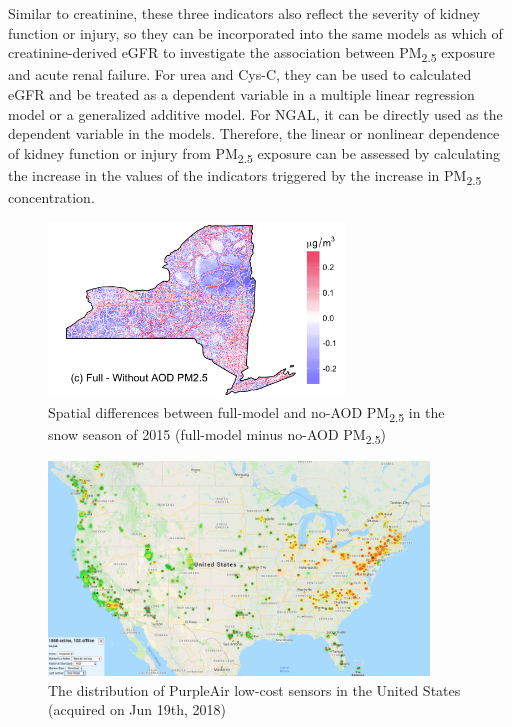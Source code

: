 \documentclass[11pt]{article}
\newcommand{\tsub}{\textsubscript}
\begin{document}
\begin{enumerate*}[{[a)]}]
{\begin{enumerate*}[{[1)]}]
        \end{enumerate*}
    }
    \item Similar to creatinine, these three indicators also reflect the severity of kidney function or injury, so they can be incorporated into the same models as which of creatinine-derived eGFR to investigate the association between PM\tsub{2.5} exposure and acute renal failure. For urea and Cys-C, they can be used to calculated eGFR and be treated as a dependent variable in a multiple linear regression model or a generalized additive model. For NGAL, it can be directly used as the dependent variable in the models. Therefore, the linear or nonlinear dependence of kidney function or injury from PM\tsub{2.5} exposure can be assessed by calculating the increase in the values of the indicators triggered by the increase in PM\tsub{2.5} concentration.
\end{enumerate*}


\newpage

\begin{figure}[H]
    \centering
    \includegraphics[width=0.7\textwidth]{img/no_aod.png}
    \caption{Spatial differences between full-model and no-AOD PM\tsub{2.5} in the snow season of 2015 (full-model minus no-AOD PM\tsub{2.5})}
    \label{fig:noaod}
\end{figure}

\begin{figure}[H]
    \centering
    \includegraphics[width=0.9\textwidth]{img/purpleair.jpg}
    \caption{The distribution of PurpleAir low-cost sensors in the United States (acquired on Jun 19th, 2018)}
    \label{fig:pa}
\end{figure}
\end{document}
